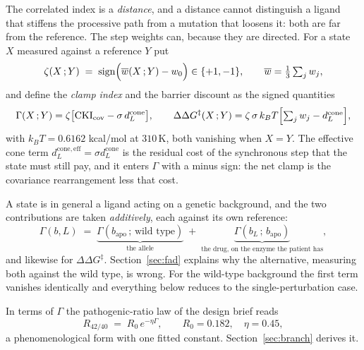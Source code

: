 \documentclass[11pt,reqno]{amsart}
\theoremstyle{plain}
\theoremstyle{definition}
\theoremstyle{remark}
\numberwithin{equation}{section}
\newcommand{\CKI}{\mathrm{CKI}}
\newcommand{\CKIcov}{\CKI_{\mathrm{cov}}}
\newcommand{\dcone}{d_L^{\mathrm{cone}}}
\newcommand{\dconeeff}{d_L^{\mathrm{cone,eff}}}
\newcommand{\kT}{k_{B}T}
\begin{document}
The correlated index is a \emph{distance}, and a distance cannot distinguish a ligand that stiffens the processive path from a mutation that loosens it: both are far from the reference. The step weights can, because they are directed. For a state $X$ measured against a reference $Y$ put
\begin{equation}
\label{eq:zeta}
\zeta(X\,;Y)\;=\;\operatorname{sign}\Bigl(\overline{w}(X\,;Y)-w_0\Bigr)\in\{+1,-1\},
\qquad \overline{w}=\tfrac13\textstyle\sum_j w_j ,
\end{equation}
and define the \emph{clamp index} and the barrier discount as the signed quantities
\begin{equation}
\label{eq:clamp}
\Gamma(X\,;Y)=\zeta\bigl[\CKIcov-\sigma\,\dcone\bigr],
\qquad
\Delta\Delta G^{\ddagger}(X\,;Y)=\zeta\,\sigma\,\kT\Bigl[\textstyle\sum_j w_j-\dcone\Bigr],
\end{equation}
with $\kT=0.6162$ kcal/mol at $310$\,K, both vanishing when $X=Y$. The effective cone term $\dconeeff=\sigma\dcone$ is the residual cost of the synchronous step that the state must still pay, and it enters $\Gamma$ with a minus sign: the net clamp is the covariance rearrangement less that cost.

A state is in general a ligand acting on a genetic background, and the two contributions are taken \emph{additively}, each against its own reference:
\begin{equation}
\label{eq:additive}
\Gamma(b,L)\;=\;\underbrace{\Gamma(b_{\mathrm{apo}}\,;\,\text{wild type})}_{\text{the allele}}
\;+\;\underbrace{\Gamma(b_{L}\,;\,b_{\mathrm{apo}})}_{\text{the drug, on the enzyme the patient has}},
\end{equation}
and likewise for $\Delta\Delta G^{\ddagger}$. Section~\ref{sec:fad} explains why the alternative, measuring both against the wild type, is wrong. For the wild-type background the first term vanishes identically and everything below reduces to the single-perturbation case.

In terms of $\Gamma$ the pathogenic-ratio law of the design brief reads
\begin{equation}
\label{eq:ratio}
R_{42/40}\;=\;R_0\,e^{-\eta\Gamma},\qquad R_0=0.182,\quad\eta=0.45,
\end{equation}
a phenomenological form with one fitted constant. Section~\ref{sec:branch} derives it.
\end{document}
